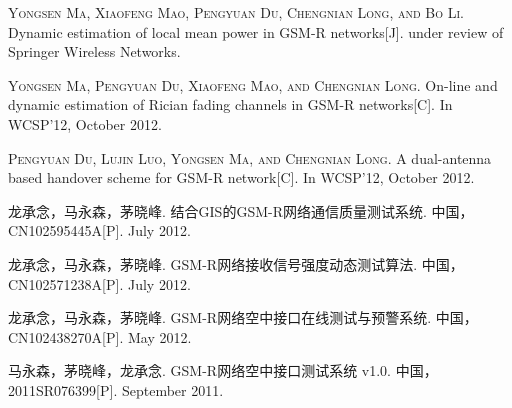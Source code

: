 
\begin{publications}{99}

    \item\textsc{Yongsen Ma, Xiaofeng Mao, Pengyuan Du, Chengnian Long, and Bo Li}. {Dynamic estimation of local mean power in GSM-R networks}[J]. under review of Springer Wireless Networks.


    \item\textsc{Yongsen Ma, Pengyuan Du, Xiaofeng Mao, and Chengnian Long}. {On-line and dynamic estimation of Rician fading channels in GSM-R networks}[C]. In WCSP’12, October 2012.

    \item\textsc{Pengyuan Du, Lujin Luo, Yongsen Ma, and Chengnian Long}. {A dual-antenna based handover scheme for GSM-R network}[C]. In WCSP’12, October 2012.

    \item\textsc{龙承念，马永森，茅晓峰}. {结合GIS的GSM-R网络通信质量测试系统}. {中国，CN102595445A}[P]. July 2012.

    \item\textsc{龙承念，马永森，茅晓峰}. {GSM-R网络接收信号强度动态测试算法}. {中国，CN102571238A}[P]. July 2012.

    \item\textsc{龙承念，马永森，茅晓峰}. {GSM-R网络空中接口在线测试与预警系统}. {中国，CN102438270A}[P]. May 2012.

    \item\textsc{马永森，茅晓峰，龙承念}. {GSM-R网络空中接口测试系统 v1.0}. {中国，2011SR076399}[P]. September 2011.
\end{publications}
